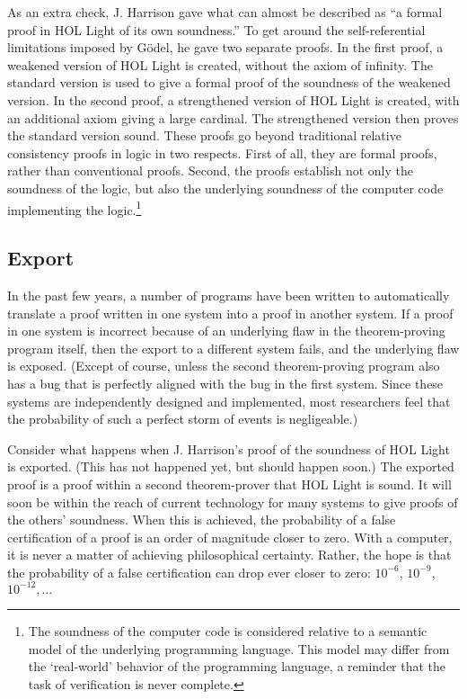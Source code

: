 \documentclass{llncs}
\begin{document}
As an extra check, J. Harrison gave what can almost be described as 
``a formal proof in HOL Light of its own soundness.''   To get around the self-referential limitations
imposed by G\"odel, he gave two separate proofs.  In the first proof, a weakened
version of HOL Light is created, without the axiom of infinity.  The standard version is
used to give a formal proof of the soundness of the weakened version.  In the second proof, a strengthened
version of HOL Light is created, with an additional axiom giving a large cardinal.  The strengthened
version then proves the standard version sound.  These proofs go beyond traditional relative consistency
proofs in logic in two respects.  First of all, they are formal proofs, rather than conventional proofs.
Second, the proofs establish not only the soundness of the logic, but also the underlying soundness
of the computer code implementing the logic.\footnote{The soundness of the computer code is considered
relative to a semantic model of the underlying programming language.  This model may differ from
the `real-world' behavior of the programming language, a reminder that the task of verification
is never complete.}

\subsection{Export}

In the past few years, a number of
programs have been written to automatically translate a proof written in one system into
a proof in another system.  If a proof in one system is incorrect because of an underlying
flaw in the theorem-proving program itself, then the export to
a different system fails, and the underlying flaw is exposed.  (Except of course,
unless the second theorem-proving program also has a bug that is perfectly aligned with the
bug in the first system.  Since these systems are independently designed and implemented, 
most researchers feel that the probability of such a perfect storm of events is negligeable.)

Consider what happens when J. Harrison's proof of the soundness of HOL Light is exported.
(This has not happened yet, but should happen soon.)
The exported proof is a proof within a second theorem-prover that HOL Light is sound.  
It will soon be within the reach of current technology for many systems to give proofs
of the others' soundness.  When this is achieved, the probability of a false certification
of a proof is an order of magnitude closer to zero.  With a computer, it 
is never a matter of achieving philosophical certainty.
Rather, the hope is that the probability of a false certification
can drop ever closer to zero: $10^{-6}$, $10^{-9}$, $10^{-12},\ldots$
\end{document}
